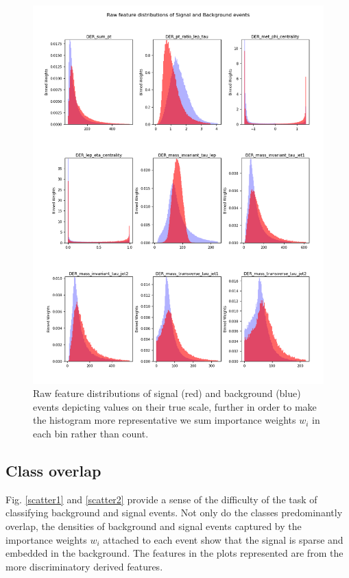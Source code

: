 \begin{figure}
\includegraphics[width=\textwidth]{images/der_features2.png}
\caption[Raw feature distributions]{Raw feature distributions of signal (red) and background (blue) events depicting values on their true scale, further in order to make the histogram more representative we sum importance weights $w_{i}$ in each bin rather than count.}
\label{unscaled_features2}
\end{figure}

\subsection{Class overlap}

Fig. \ref{scatter1} and \ref{scatter2} provide a sense of the difficulty of the task of classifying background and signal events. Not only do the classes predominantly overlap, the densities of background and signal events captured by the importance weights $w_{i}$ attached to each event show that the signal is sparse and embedded in the background.  The features in the plots represented are from the more discriminatory derived features. 

